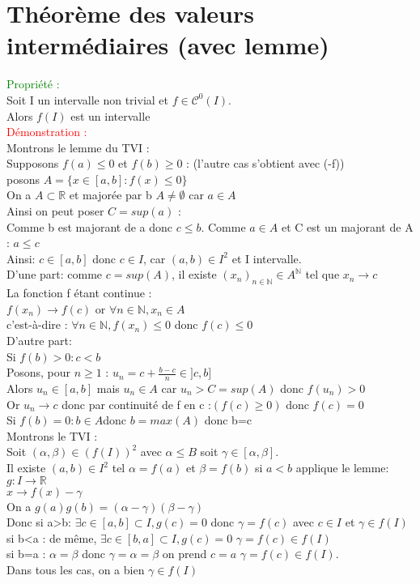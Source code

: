\documentclass{article}
\begin{document}
\section{Théorème des valeurs intermédiaires (avec lemme)}
\textcolor{green}{Propriété :} \\ 
Soit I un intervalle non trivial et $f \in \mathcal{C}^0(I)$. \\ 
Alors $f(I)$ est un intervalle \\ 
\textcolor{red}{Démonstration :} \\ 
Montrons le lemme du TVI : \\ 
Supposons $f(a) \leq 0$ et $f(b) \geq 0$ : (l'autre cas s'obtient avec (-f)) \\
posons $A= \lbrace x \in [a,b] : f(x) \leq 0 \rbrace$ \\ 
On a $ A \subset \mathbb{R}$ et majorée par b $A \neq \emptyset$ car $a \in A$ \\ 
Ainsi on peut poser $C=sup(a)$ : \\ 
Comme b est majorant de a donc $c \leq b$. Comme $a \in A$ et C est un majorant de A : $a \leq c$ \\ 
Ainsi: $c \in [a,b]$ donc $c \in I$, car $(a,b) \in I^2$ et I intervalle. \\ 
D'une part: comme $c=sup(A)$, il existe $(x_n)_{n\in \mathbb{N}} \in A^{\mathbb{N}}$ tel que $x_n \rightarrow c$ \\ 
La fonction f étant continue : \\ 
$f(x_n) \rightarrow f(c)$ or $\forall n \in \mathbb{N},x_n \in A$ \\ 
c'est-à-dire : $\forall n \in \mathbb{N}, f(x_n) \leq 0$ donc $f(c)\leq 0$ \\ 
D'autre part: \\ 
Si $f(b)>0:c<b$ \\ 
Posons, pour $n \geq 1$ : $u_n=c+\frac{b-c}{n} \in ]c,b]$ \\ 
Alors $u_n \in [a,b]$ mais $u_n \in A$ car $u_n>C=sup(A)$ donc $f(u_n)>0$ \\ 
Or $u_n  \rightarrow c$ donc par continuité de f en c :$(f(c)\geq 0)$ donc $f(c) = 0$ \\ 
Si $f(b)=0: b \in A$donc $b=max(A)$ donc b=c \\ 
Montrons le TVI : \\ 
Soit $(\alpha, \beta) \in (f(I))^2$ avec $\alpha \leq B$ soit $ \gamma \in [\alpha,\beta]$. \\ 
Il existe $(a,b) \in I^2$ tel $\alpha=f(a)$ et $\beta=f(b)$ si $a<b$ applique le lemme: \\ 
$g:I \rightarrow \mathbb{R}$ \\ 
$x \rightarrow f(x)- \gamma$ \\ 
On a $g(a)g(b)=(\alpha - \gamma)(\beta-\gamma)$ \\ 
Donc si a>b: $\exists c \in [a,b] \subset I, g(c)=0$ donc $\gamma=f(c)$ avec $c\in I$ et $\gamma \in f(I)$ \\ 
si b<a : de même, $\exists c \in [b,a] \subset I, g(c)=0$ $\gamma=f(c) \in f(I)$ \\ 
si b=a : $\alpha=\beta$ donc $\gamma=\alpha=\beta$ on prend $c=a$ $\gamma=f(c)\in f(I)$. \\
Dans tous les cas, on a bien $\gamma \in f(I)$
\end{document}
